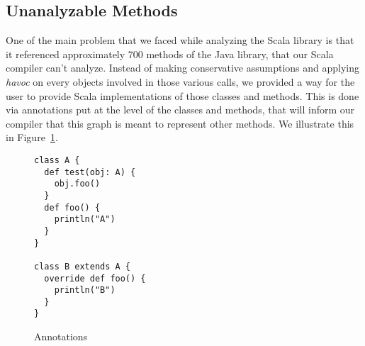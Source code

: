 \subsection{Unanalyzable Methods}
One of the main problem that we faced while analyzing the Scala library is that
it referenced approximately 700 methods of the Java library, that our Scala
compiler can't analyze. Instead of making conservative assumptions and applying
\emph{havoc} on every objects involved in those various calls, we provided a way
for the user to provide Scala implementations of those classes and methods. This
is done via annotations put at the level of the classes and methods, that will
inform our compiler that this graph is meant to represent other methods. We
illustrate this in Figure~\ref{fig:imp:annotations}.
\begin{figure}[h]
    \centering
\begin{lstlisting}
class A {
  def test(obj: A) {
    obj.foo()
  }
  def foo() {
    println("A")
  }
}

class B extends A {
  override def foo() {
    println("B")
  }
}
\end{lstlisting}
    \caption{Annotations}
    \label{fig:imp:annotations}
\end{figure}
